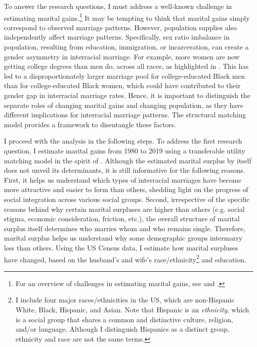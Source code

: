 To answer the research questions, I must address a well-known challenge in estimating marital gains.\footnote{For an overview of challenges in estimating marital gains, see \cite{ChiapporiSalanie_2016_EconometricsMatching} and \cite{Chiappori_2020_AnnuRevEconMarriage}.} It may be tempting to think that marital gains simply correspond to observed marriage patterns. However, population supplies also independently affect marriage patterns. Specifically, sex ratio imbalance in population, resulting from education, immigration, or incarceration, can create a gender asymmetry in interracial marriage. For example, more women are now getting college degrees than men do, across all races, as highlighted in \cite{GoldinKatzKuziemko_2006_GenderGapCollege}. This has led to a disproportionately larger marriage pool for college-educated Black men than for college-educated Black women, which could have contributed to their gender gap in interracial marriage rates. Hence, it is important to distinguish the separate roles of changing marital gains and changing population, as they have different implications for interracial marriage patterns.  The structural matching model provides a framework to disentangle these factors. 

I proceed with the analysis in the following steps. To address the first research question, I estimate marital gains from 1980 to 2019 using a transferable utility matching model in the spirit of \cite{ChooSiow_2006_WhoMarriesWhomandWhy}. Although the estimated marital surplus by itself does not unveil its determinants, it is still informative for the following reasons. First, it helps us understand which types of interracial marriages have become more attractive and easier to form than others, shedding light on the progress of social integration across various social groups. Second, irrespective of the specific reasons behind why certain marital surpluses are higher than others (e.g. social stigma, economic consideration, friction, etc.), the overall structure of marital surplus itself determines who marries whom and who remains single. Therefore, marital surplus helps us understand why some demographic groups intermarry less than others. Using the US Census data, I estimate how marital surpluses have changed, based on the husband's and wife's race/ethnicity\footnote{I include four major races/ethnicities in the US, which are non-Hispanic White, Black, Hispanic, and Asian. Note that Hispanic is an \textit{ethnicity}, which is a social group that shares a common and distinctive culture, religion, and/or language. Although I distinguish Hispanics as a distinct group, ethnicity and race are not the same terms.} and education. 


